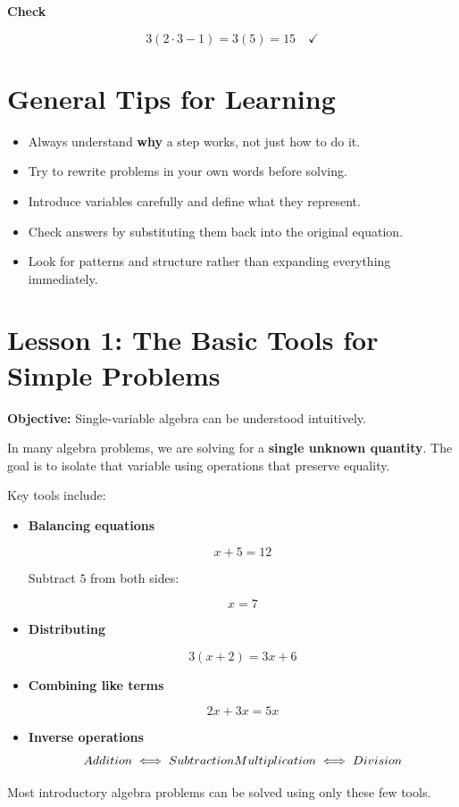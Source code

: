 \documentclass[11pt]{article}
\begin{document}
\textbf{Check}

\[
3(2\cdot3-1)=3(5)=15 \quad \checkmark
\]

\begin{purplebox}
\section{General Tips for Learning}

\begin{itemize}
\item Always understand \textbf{why} a step works, not just how to do it.
\item Try to rewrite problems in your own words before solving.
\item Introduce variables carefully and define what they represent.
\item Check answers by substituting them back into the original equation.
\item Look for patterns and structure rather than expanding everything immediately.
\end{itemize}

\section{Lesson 1: The Basic Tools for Simple Problems}

\textbf{Objective:} Single-variable algebra can be understood intuitively.

In many algebra problems, we are solving for a \textbf{single unknown quantity}.  
The goal is to isolate that variable using operations that preserve equality.

Key tools include:

\begin{itemize}

\item \textbf{Balancing equations}

\[
x+5=12
\]

Subtract $5$ from both sides:

\[
x=7
\]

\item \textbf{Distributing}

\[
3(x+2)=3x+6
\]

\item \textbf{Combining like terms}

\[
2x+3x=5x
\]

\item \textbf{Inverse operations}
\[
Addition \iff Subtraction \\ 
Multiplication \iff Division
\]
\end{itemize}

Most introductory algebra problems can be solved using only these few tools.

\end{purplebox}
\end{document}
